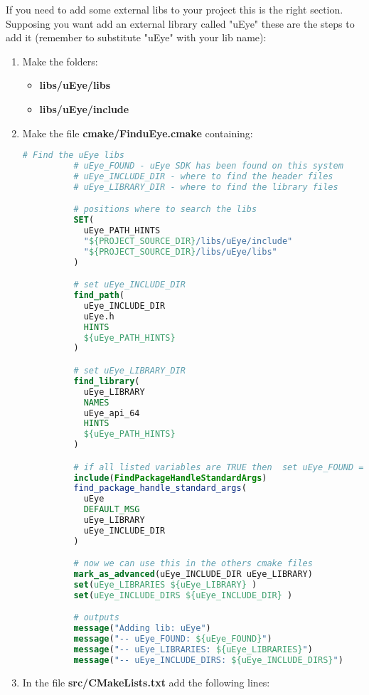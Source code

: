 If you need to add some external libs to your project this is the right
section. Supposing you want add an external library called "uEye" these
are the steps to add it (remember to substitute "uEye" with your lib
name):

\begin{enumerate}
  \def\labelenumi{\arabic{enumi}.}
  \item
        Make the folders:

        \begin{itemize}
          \item
                \textbf{libs/uEye/libs}
          \item
                \textbf{libs/uEye/include}
        \end{itemize}
  \item
        Make the file \textbf{cmake/FinduEye.cmake} containing:

        \begin{lstlisting}[language=cmake]
          # Find the uEye libs
          # uEye_FOUND - uEye SDK has been found on this system
          # uEye_INCLUDE_DIR - where to find the header files
          # uEye_LIBRARY_DIR - where to find the library files

          # positions where to search the libs
          SET(
            uEye_PATH_HINTS
            "${PROJECT_SOURCE_DIR}/libs/uEye/include"
            "${PROJECT_SOURCE_DIR}/libs/uEye/libs"
          )

          # set uEye_INCLUDE_DIR
          find_path(
            uEye_INCLUDE_DIR
            uEye.h
            HINTS
            ${uEye_PATH_HINTS}
          )

          # set uEye_LIBRARY_DIR
          find_library(
            uEye_LIBRARY
            NAMES
            uEye_api_64
            HINTS
            ${uEye_PATH_HINTS}
          )

          # if all listed variables are TRUE then  set uEye_FOUND = TRUE
          include(FindPackageHandleStandardArgs)
          find_package_handle_standard_args(
            uEye
            DEFAULT_MSG
            uEye_LIBRARY
            uEye_INCLUDE_DIR
          )

          # now we can use this in the others cmake files
          mark_as_advanced(uEye_INCLUDE_DIR uEye_LIBRARY)
          set(uEye_LIBRARIES ${uEye_LIBRARY} )
          set(uEye_INCLUDE_DIRS ${uEye_INCLUDE_DIR} )

          # outputs
          message("Adding lib: uEye")
          message("-- uEye_FOUND: ${uEye_FOUND}")
          message("-- uEye_LIBRARIES: ${uEye_LIBRARIES}")
          message("-- uEye_INCLUDE_DIRS: ${uEye_INCLUDE_DIRS}")
        \end{lstlisting}
  \item
        In the file \textbf{src/CMakeLists.txt} add the following lines:


\end{enumerate}
